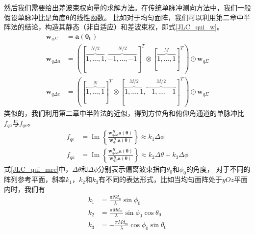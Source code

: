 \documentclass[master]{thesis-uestc}
\begin{document}
然后我们需要给出差波束权向量的求解方法。在传统单脉冲测向方法中，我们一般假设单脉冲比是角度$\bm{\theta}$的线性函数。
比如对于均匀面阵，我们可以利用第二章中半阵法的结论，构造其静态（非自适应）和差波束权，即式\eqref{JLC_qui_w}。
\begin{subequations}\label{JLC_qui_w}
    \begin{align}
        \bm{w}_{q\Sigma} &= \bm{a}(\bm{\theta}_0) \\
        \bm{w}_{q\Delta a} &= ([\overbrace{1, \ldots, 1}^{N / 2}, \overbrace{-1, \ldots,-1}^{N / 2}]^T 
        \otimes[\overbrace{1, \ldots, 1}^M]^T) \odot \bm{w}_{q\Sigma} \\
        \bm{w}_{q\Delta e} &= ([\overbrace{1, \ldots, 1}^N]^T \otimes
        [\overbrace{1, \ldots, 1}^{M / 2}, \overbrace{-1, \ldots,-1}^{M / 2}]^T) \odot \bm{w}_{q\Sigma}
    \end{align}
\end{subequations}
类似的，我们利用第二章中半阵法的近似，得到方位角和俯仰角通道的单脉冲比$f_{qa}$与$f_{qe}$。
\begin{subequations}\label{JLC_qui_mrc}
    \begin{align}
        f_{qe} &= \operatorname{Im}
        \left\{
            \frac{\bm{w}^H_{q\Delta e}\bm{a}(\bm{\theta})}
            {\bm{w}^H_{q\Sigma}\bm{a}(\bm{\theta})}
        \right\} 
        \approx k_1\Delta\phi
        \\
        f_{qa} &= \operatorname{Im}
        \left\{
            \frac{\bm{w}^H_{q\Delta a}\bm{a}(\bm{\theta})}
            {\bm{w}^H_{q\Sigma}\bm{a}(\bm{\theta})}
        \right\}
        \approx k_2\Delta\theta + k_3\Delta\phi
    \end{align}
\end{subequations}
式\eqref{JLC_qui_mrc}中，$\Delta\theta$和$\Delta\phi$分别表示偏离波束指向$\theta_0$和$\phi_0$的角度，
对于不同的阵列参考平面，斜率$k_1$，$k_2$和$k_3$有不同的表达形式，比如当均匀面阵处于$yOz$平面内时，我们有
\begin{subequations}
    \begin{align}
        k_1 &= \frac{\pi N d_n}{\lambda}\sin\phi_0 \\
        k_2 &= \frac{\pi M d_m}{\lambda}\sin\phi_0\cos\theta_0 \\
        k_3 &= -\frac{\pi M d_m}{\lambda}\cos\phi_0\sin\theta_0
    \end{align}
\end{subequations}
\end{document}
